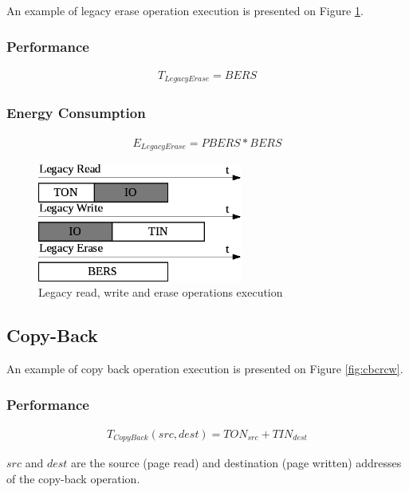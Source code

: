 \documentclass[oneside]{memoir}
\begin{document}
An example of legacy erase operation execution is presented on Figure \ref{fig:legrwe}.

\subsubsection{Performance}

\begin{align} T_{LegacyErase} = BERS \end{align}

\subsubsection{Energy Consumption}

\begin{align} E_{LegacyErase} = PBERS*BERS \end{align}

\begin{figure}
  \center
  \includegraphics[width=0.6\textwidth]{Includes/LegacyReadWriteErase.png}
  \caption{Legacy read, write and erase operations execution}
  \label{fig:legrwe}
\end{figure}

\subsection{Copy-Back}

An example of copy back operation execution is presented on Figure \ref{fig:cbcrcw}.

\subsubsection{Performance}

\begin{align} T_{CopyBack}(src, dest) = TON_{src} + TIN_{dest} \end{align}

$src$ and $dest$ are the source (page read) and destination (page written) addresses of the copy-back operation.
\end{document}
